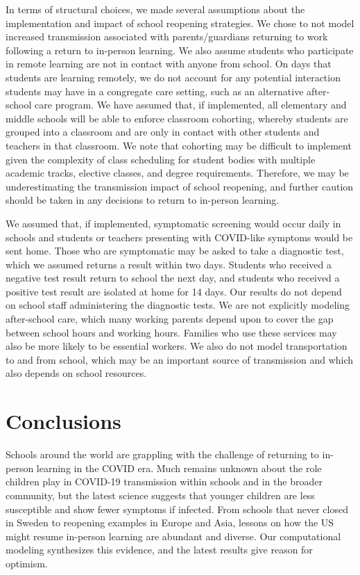 \documentclass[9pt,twocolumn,twoside,lineno]{pnas-new}
\begin{document}
In terms of structural choices, we made several assumptions about the implementation and impact of school reopening strategies. We chose to not model increased transmission associated with parents/guardians returning to work following a return to in-person learning. We also assume students who participate in remote learning are not in contact with anyone from school. On days that students are learning remotely, we do not account for any potential interaction students may have in a congregate care setting, such as an alternative after-school care program. We have assumed that, if implemented, all elementary and middle schools will be able to enforce classroom cohorting, whereby students are grouped into a classroom and are only in contact with other students and teachers in that classroom. We note that cohorting may be difficult to implement given the complexity of class scheduling for student bodies with multiple academic tracks, elective classes, and degree requirements. Therefore, we may be underestimating the transmission impact of school reopening, and further caution should be taken in any decisions to return to in-person learning.

We assumed that, if implemented, symptomatic screening would occur daily in schools and students or teachers presenting with COVID-like symptoms would be sent home. Those who are symptomatic may be asked to take a diagnostic test, which we assumed returns a result within two days. Students who received a negative test result return to school the next day, and students who received a positive test result are isolated at home for 14 days. Our results do not depend on school staff administering the diagnostic tests. We are not explicitly modeling after-school care, which many working parents depend upon to cover the gap between school hours and working hours. Families who use these services may also be more likely to be essential workers. We also do not model transportation to and from school, which may be an important source of transmission and which also depends on school resources.


\section*{Conclusions}

Schools around the world are grappling with the challenge of returning to in-person learning in the COVID era. Much remains unknown about the role children play in COVID-19 transmission within schools and in the broader community, but the latest science suggests that younger children are less susceptible and show fewer symptoms if infected. From schools that never closed in Sweden to reopening examples in Europe and Asia, lessons on how the US might resume in-person learning are abundant and diverse. Our computational modeling synthesizes this evidence, and the latest results give reason for optimism.
\end{document}
